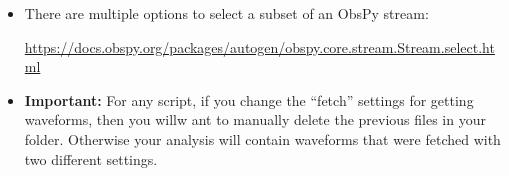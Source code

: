 \documentclass[11pt,titlepage,fleqn]{article}
\begin{document}
\begin{spacing}{1.0}
\begin{itemize}
\begin{itemize}
\item instrument response and Fourier analysis: \citet[][Ch.~6]{SteinWysession}
\item directivity: \citet[][Section 4.3.2]{SteinWysession} 
\item Sumatra earthquake: \citet{Lay2005,Ammon2005,Park2005,Ni2005,SSteinOkal2007}
\item normal modes: \citet[][Section 2.9]{SteinWysession} and \citet[][Ch.~8]{DT}. See also ``Computational details'' in Section 10.5.1 of DT.
\item PDFs of all referenced Sumatra papers can be found in the class google drive.


\end{itemize}


\item There are multiple options to select a subset of an ObsPy stream:

\url{https://docs.obspy.org/packages/autogen/obspy.core.stream.Stream.select.html}

%

%


\item {\bf Important:} For any script, if you change the ``fetch'' settings for getting waveforms, then you willw ant to manually delete the previous files in your folder. Otherwise your analysis will contain waveforms that were fetched with two different settings.

\end{itemize}

\end{spacing}
\end{document}
